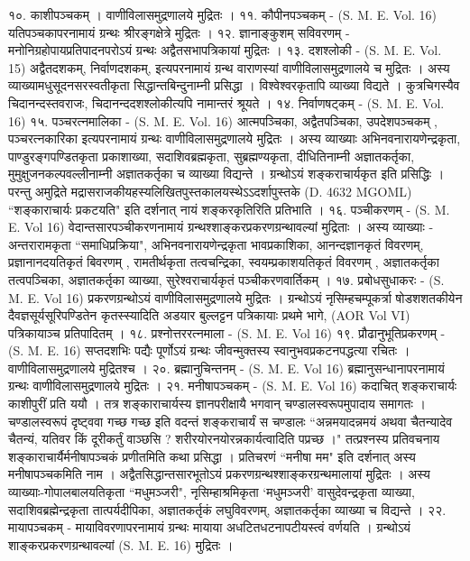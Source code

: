 १०. काशीपञ्चकम् । वाणीविलासमुद्रणालये मुद्रितः ।
११. कौपीनपञ्चकम् - (S. M. E. Vol. 16)
यतिपञ्चकापरनामायं ग्रन्थः श्रीरङ्गक्षेत्रे मुद्रितः ।
१२. ज्ञानाङ्कुशम् सविवरणम् -
मनोनिग्रहोपायप्रतिपादनपरोऽयं ग्रन्थः अद्वैतसभापत्रिकायां मुद्रितः ।
१३. दशश्लोकी - (S. M. E. Vol. 15)
अद्वैतदशकम्, निर्वाणदशकम्, इत्यपरनामायं ग्रन्थ वाराणस्यां वाणीविलासमुद्रणालये च मुद्रितः । अस्य व्याख्यामधुसूदनसरस्वतीकृता सिद्धान्तबिन्दुनाम्नी प्रसिद्धा । विश्वेश्वरकृतापि व्याख्या विद्यते । कुत्रचिगस्यैव चिदानन्दस्तवराजः, चिदानन्ददशश्लोकीत्यपि नामान्तरं श्रूयते ।
१४. निर्वाणषट्कम् - (S. M. E. Vol. 16)
१५. पञ्चरत्नमालिका - (S. M. E. Vol. 16)
आत्मपञ्चिका, अद्वैतपञ्चिका, उपदेशपञ्चकम् , पञ्चरत्नकारिका इत्यपरनामायं ग्रन्थः वाणीविलासमुद्रणालये मुद्रितः । अस्य व्याख्याः अभिनवनारायणेन्द्रकृता, पाण्डुरङ्गपण्डितकृता प्रकाशाख्या, सदाशिवब्रह्मकृता, सुब्रह्मण्यकृता, दीधितिनाम्नी अज्ञातकर्तृका, मुमुक्षुजनकल्पवल्लीनाम्नी अज्ञातकर्तृका च व्याख्या विद्यन्ते । ग्रन्थोऽयं शङ्कराचार्यकृत इति प्रसिद्धिः । परन्तु अमुद्रिते मद्रासराजकीयहस्यलिखितपुस्तकालयस्थेऽऽदर्शापुस्तके (D. 4632 MGOML)  ``शङ्काराचार्यः प्रकटयति" इति दर्शनात् नायं शङ्करकृतिरिति प्रतिभाति ।
१६. पञ्चीकरणम् - (S. M. E. Vol 16)
वेदान्तसारपञ्चीकरणनामायं ग्रन्थश्शाङ्करप्रकरणग्रन्थावल्यां मुद्रिताः । अस्य व्याख्याः - अन्तरारामकृता ``समाधिप्रक्रिया", अभिनवनारायणेन्द्रकृता भावप्रकाशिका, आनन्दज्ञानकृतं विवरणम्, प्रज्ञानानदयतिकृतं बिवरणम् , रामतीर्थकृता तत्वचन्द्रिका, स्वयम्प्रकाशयतिकृतं विवरणम् , अज्ञातकर्तृका तत्वपञ्चिका, अज्ञातकर्तृका व्याख्या, सुरेश्वराचार्यकृतं पञ्चीकरणवार्तिकम् ।
१७. प्रबोधसुधाकरः - (S. M. E. Vol 16)
प्रकरणग्रन्थोऽयं वाणीविलासमुद्रणालये मुद्रितः । ग्रन्थोऽयं नृसिम्हचम्पूकर्त्रा षोडशशतकीयेन दैवज्ञसूर्यसूरिपण्डितेन कृतस्स्यादिति अडयार बुल्लट्टन पत्रिकायाः प्रथमे भागे, (AOR Vol VI) पत्रिकायाञ्च प्रतिपादितम् ।
१८. प्रश्नोत्तररत्नमाला - (S. M. E. Vol 16)
१९. प्रौढानुभूतिप्रकरणम् - (S. M. E. 16)
सप्तदशभिः पद्यैः पूर्णोऽयं ग्रन्थः जीवन्मुक्तस्य स्वानुभवप्रकटनपद्धत्या रचितः । वाणीविलासमुद्रणालये मुद्रितश्च । 
२०. ब्रह्मानुचिन्तनम् - (S. M. E. Vol 16)
ब्रह्मानुसन्धानापरनामायं ग्रन्थः वाणीविलासमुद्रणालये मुद्रितः ।
२१. मनीषापञ्चकम् - (S. M. E. Vol 16)
कदाचित् शङ्कराचार्यः काशीपुरीं प्रति ययौ । तत्र शङ्काराचार्यस्य ज्ञानपरीक्षायै भगवान् चण्डालस्वरूपमुपादाय समागतः । चण्डालस्वरूपं दृष्ट्ववा गच्छ गच्छ इति वदन्तं शङ्कराचार्यं स चण्डालः ``अन्नमयादन्नमयं अथवा चैतन्यादेव चैतन्यं, यतिवर किं दूरीकर्तुं वाञ्छसि ? शरीरयोरनयोरन्नकार्यत्वादिति पप्रच्छ ।" तत्प्रश्नस्य प्रतिवचनाय शङ्काराचार्यैर्मनीषापञ्चकं प्रणीतमिति कथा प्रसिद्धा । प्रतिचरणं ``मनीषा मम" इति दर्शनात् अस्य मनीषापञ्चकमिति नाम । अद्वैतसिद्धान्तसारभूतोऽयं प्रकरणग्रन्थश्शाङ्करग्रन्थमालायां मुद्रितः । अस्य व्याख्याः-गोपालबालयतिकृता ``मधुमञ्जरी", नृसिम्हाश्रमिकृता `मधुमञ्जरी' वासुदेवन्द्रकृता व्याख्या, सदाशिवब्रह्मेन्द्रकृता तात्पर्यदीपिका, अज्ञातकर्तृकं लघुविवरणम्, अज्ञातकर्तृका व्याख्या च विद्यन्ते । 
२२. मायापञ्चकम् -
मायाविवरणापरनामायं ग्रन्थः मायाया अधटितधटनापटीयस्त्वं वर्णयति । ग्रन्थोऽयं शाङ्करप्रकरणग्रन्थावल्यां (S. M. E. 16) मुद्रितः ।

